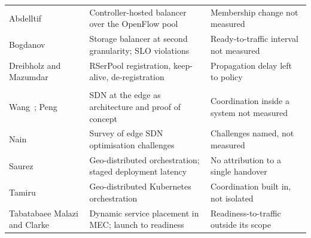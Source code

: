 ﻿\documentclass[12pt,reqno,twoside]{amsbook}
\begin{document}
{\begin{table}[H]
\begin{tabular}{p{} p{} p{}}
        Abdelltif~\parencite{Abdelltif2018SDNLoadBalancingServiceCloud} & Controller-hosted balancer over the OpenFlow pool & Membership change not measured \\
        Bogdanov~\parencite{Bogdanov2018Kurma} & Storage balancer at second granularity; SLO violations & Ready-to-traffic interval not measured \\
        Dreibholz and \mbox{Mazumdar}~\parencite{Dreibholz2023TowardsLightweightTaskSchedulingFramework} & RSerPool registration, keep-alive, de-registration & Propagation delay left to policy \\
        \addlinespace[1pt]
        \multicolumn{3}{l}{\textit{Orchestration and placement (6)}} \\
        Wang~\parencite{Wang2019SoftwareDefinedNetworkingEnhancedEdge}; Peng~\parencite{Peng2019SDNResourceManagementAutonomousVehicular} & SDN at the edge as architecture and proof of concept & Coordination inside a system not measured \\
        Nain~\parencite{Nain2024ResourceOptimizationEdgeSDNEdge} & Survey of edge SDN optimisation challenges & Challenges named, not measured \\
        Saurez~\parencite{Saurez2021OneEdge} & Geo-distributed orchestration; staged deployment latency & No attribution to a single handover \\
        Tamiru~\parencite{Tamiru2021Mck8sOrchestrationPlatformGeoDistributed} & Geo-distributed Kubernetes orchestration & Coordination built in, not isolated \\
        Tabatabaee Malazi and Clarke~\parencite{TabatabaeeMalazi2022DynamicServicePlacementMultiAccess} & Dynamic service placement in MEC; launch to readiness & Readiness-to-traffic outside its scope \\
        \bottomrule
    \end{tabular}
\end{table}

}
\end{document}
